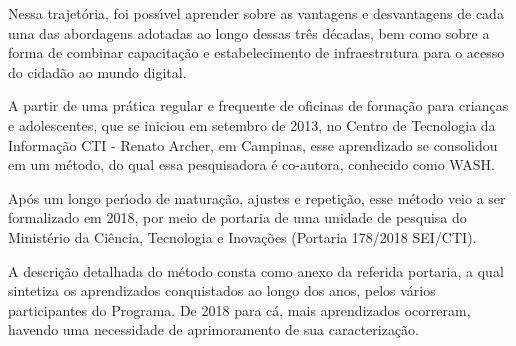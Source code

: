 \documentclass[
12pt,		%
openright,	%
twoside,  %
a4paper,			%
chapter=TITLE,		%
english,			%
french,				%
spanish,			%
brazil				%
]{USPSC-classe/USPSC}
\begin{document}
Nessa trajet\'oria, foi poss\'{\i}vel aprender sobre as vantagens e desvantagens de cada uma das abordagens adotadas ao longo dessas tr\^es d\'ecadas, bem como sobre a forma de combinar capacita\c{c}\~ao e estabelecimento de infraestrutura para o acesso do cidad\~ao ao mundo digital.

















A partir de uma pr\'atica regular e frequente de oficinas de forma\c{c}\~ao para  crian\c{c}as e adolescentes, que se iniciou em setembro de 2013, no Centro de Tecnologia da Informa\c{c}\~ao CTI - Renato Archer, em Campinas, esse aprendizado se consolidou em um m\'etodo, do qual essa pesquisadora \'e co-autora, conhecido como WASH.

















Ap\'os um longo per\'{\i}odo de matura\c{c}\~ao, ajustes e repeti\c{c}\~ao, esse m\'etodo veio a ser formalizado em 2018, por meio de portaria de uma unidade de pesquisa do Minist\'erio da Ci\^encia, Tecnologia e Inova\c{c}\~oes (Portaria 178/2018 SEI/CTI).

















A descri\c{c}\~ao detalhada do m\'etodo consta como anexo da referida portaria, a qual sintetiza os aprendizados conquistados ao longo dos anos, pelos v\'arios participantes do Programa. De 2018 para c\'a, mais aprendizados ocorreram, havendo uma necessidade de aprimoramento de sua caracteriza\c{c}\~ao.
\end{document}
